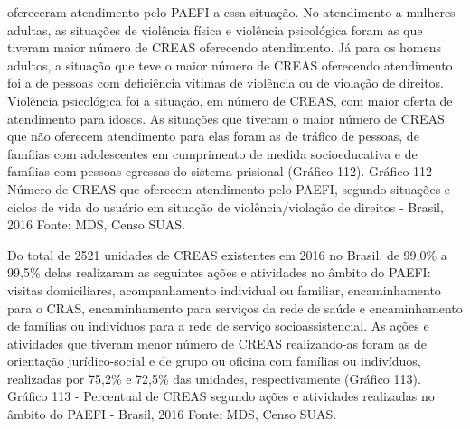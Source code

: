 \documentclass[
  brazilian]{report}
\begin{document}
ofereceram atendimento pelo PAEFI a essa situação. No atendimento a
mulheres adultas, as situações de violência física e violência
psicológica foram as que tiveram maior número de CREAS oferecendo
atendimento. Já para os homens adultos, a situação que teve o maior
número de CREAS oferecendo atendimento foi a de pessoas com deficiência
vítimas de violência ou de violação de direitos. Violência psicológica
foi a situação, em número de CREAS, com maior oferta de atendimento para
idosos. As situações que tiveram o maior número de CREAS que não
oferecem atendimento para elas foram as de tráfico de pessoas, de
famílias com adolescentes em cumprimento de medida socioeducativa e de
famílias com pessoas egressas do sistema prisional (Gráfico 112).
Gráfico 112 - Número de CREAS que oferecem atendimento pelo PAEFI,
segundo situações e ciclos de vida do usuário em situação de
violência/violação de direitos - Brasil, 2016 Fonte: MDS, Censo SUAS.

Do total de 2521 unidades de CREAS existentes em 2016 no Brasil, de
99,0\% a 99,5\% delas realizaram as seguintes ações e atividades no
âmbito do PAEFI: visitas domiciliares, acompanhamento individual ou
familiar, encaminhamento para o CRAS, encaminhamento para serviços da
rede de saúde e encaminhamento de famílias ou indivíduos para a rede de
serviço socioassistencial. As ações e atividades que tiveram menor
número de CREAS realizando-as foram as de orientação jurídico-social e
de grupo ou oficina com famílias ou indivíduos, realizadas por 75,2\% e
72,5\% das unidades, respectivamente (Gráfico 113). Gráfico 113 -
Percentual de CREAS segundo ações e atividades realizadas no âmbito do
PAEFI - Brasil, 2016 Fonte: MDS, Censo SUAS.
\end{document}
